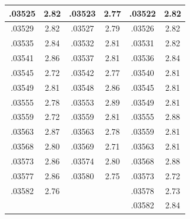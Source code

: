 \documentclass[10pt,twoside]{report}
\begin{document}
\begin{appendices}
\begin{longtable}{|c|c||c|c||c|c|}
.03525 & 2.82 & .03523 & 2.77 & .03522 & 2.82\\\hline
.03529 & 2.82 & .03527 & 2.79 & .03526 & 2.82\\\hline
.03535 & 2.84 & .03532 & 2.81 & .03531 & 2.82\\\hline
.03541 & 2.86 & .03537 & 2.81 & .03536 & 2.84\\\hline
.03545 & 2.72 & .03542 & 2.77 & .03540 & 2.81\\\hline
.03549 & 2.81 & .03548 & 2.86 & .03545 & 2.81\\\hline
.03555 & 2.78 & .03553 & 2.89 & .03549 & 2.81\\\hline
.03559 & 2.72 & .03559 & 2.81 & .03555 & 2.88\\\hline
.03563 & 2.87 & .03563 & 2.78 & .03559 & 2.81\\\hline
.03568 & 2.80 & .03569 & 2.71 & .03563 & 2.81\\\hline
.03573 & 2.86 & .03574 & 2.80 & .03568 & 2.88\\\hline
.03577 & 2.86 & .03580 & 2.75 & .03573 & 2.72\\\hline
.03582 & 2.76 &  & & .03578 & 2.73\\\hline
 & &  & & .03582 & 2.84\\\hline
\end{longtable}

\end{appendices}
\end{document}
